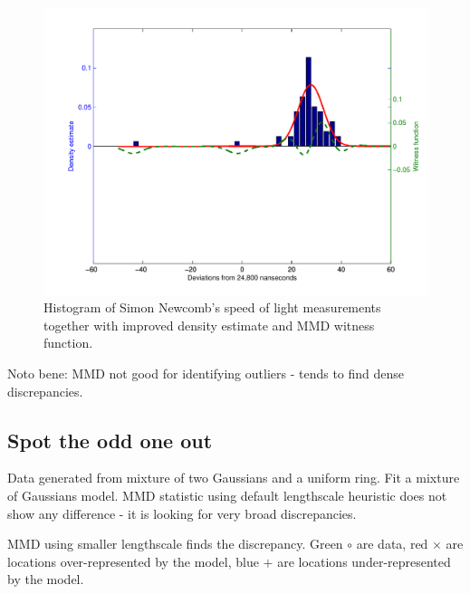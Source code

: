 \documentclass{article}
\begin{document}
\begin{figure}[ht]
\centering
\includegraphics[width=0.98\columnwidth]{figures/newcomb_witness_2}
\caption{
Histogram of Simon Newcomb's speed of light measurements together with improved density estimate and MMD witness function.
}
\label{fig:newcomb_witness_1}
\end{figure}

Noto bene: MMD not good for identifying outliers - tends to find dense discrepancies.

\subsection{Spot the odd one out}

Data generated from mixture of two Gaussians and a uniform ring.
Fit a mixture of Gaussians model.
MMD statistic using default lengthscale heuristic does not show any difference - it is looking for very broad discrepancies.

MMD using smaller lengthscale finds the discrepancy.
Green $\circ$ are data, red $\times$ are locations over-represented by the model, blue $+$ are locations under-represented by the model.
\end{document}

